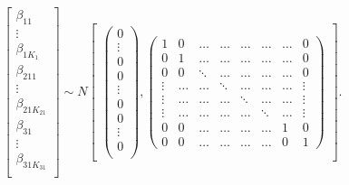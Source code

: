 \documentclass{article}\usepackage[]{graphicx}\usepackage[]{color}
\begin{document}
\begin{align}\label{matrix prior1}
\begin{bmatrix}
\beta_{11} \\
\vdots \\
\beta_{1K_{1}}\\
\beta_{211}\\
\vdots \\
\beta_{21K_{21}}\\
\beta_{31}\\
\vdots\\
\beta_{31K_{31}}\\
\end{bmatrix}
\sim N
\begin{bmatrix}
\begin{pmatrix}
0 \\
\vdots \\
0 \\
0 \\
\vdots \\
0 \\
0 \\
\vdots \\ 
0 \\ 
\end{pmatrix}
,
\begin{pmatrix}
1 & 0  & \dots & \dots & \dots & \dots  & \dots & 0      \\
0 & 1  & \dots & \dots & \dots & \dots  & \dots & 0      \\
0 & 0  & \ddots & \dots & \dots & \dots & \dots & 0      \\
\vdots & \dots & \dots & \ddots & \dots & \dots & \dots & \vdots \\
\vdots & \dots & \dots & \dots & \ddots& \dots & \dots & \vdots \\
\vdots & \dots & \dots & \dots & \dots & \ddots & \dots & \vdots \\
0 & 0  & \dots & \dots & \dots & \dots &  1 & 0  \\ 
0 & 0  & \dots & \dots & \dots & \dots &  0 & 1
\end{pmatrix}
\end{bmatrix}.
\end{align}
\end{document}
